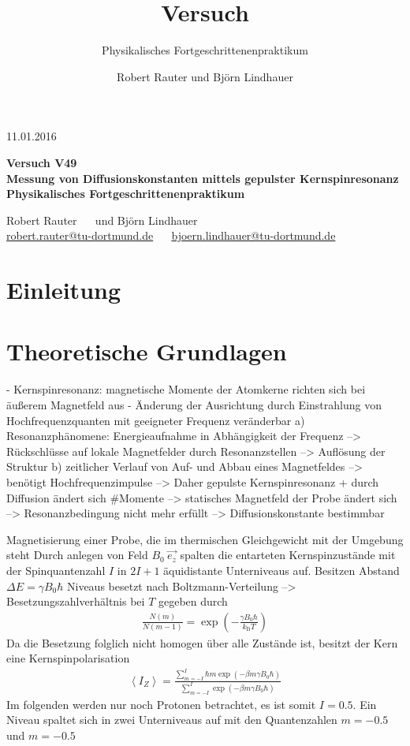 \documentclass[]{scrartcl}
\title{Versuch \versuchnummer\\ \versuchname}
\subtitle{Physikalisches Fortgeschrittenenpraktikum}
\author{Robert Rauter und Björn Lindhauer}
\date{\versuchdatum}
\newcommand{\versuchnummer}{V49}
\newcommand{\versuchname}{Messung von Diffusionskonstanten mittels gepulster Kernspinresonanz}
\newcommand{\versuchdatum}{11.01.2016}
\begin{document}
\begin{titlepage}
{\large \versuchdatum}
\vspace{7cm}
\begin{center}
\textbf{\huge Versuch \versuchnummer}\\
\vspace{0.5cm}
\textbf{\huge \versuchname}\\
\vspace{0.2cm}
\textbf{ Physikalisches Fortgeschrittenenpraktikum}\\
\vspace{9cm}

{\Large Robert Rauter \ \ \hspace{1.5cm} und \hspace{1.5cm} Björn Lindhauer}\\
{ \url{robert.rauter@tu-dortmund.de} \ \ \hspace{2cm} \url{bjoern.lindhauer@tu-dortmund.de}}
\end{center}
\end{titlepage}
\section{Einleitung}

\section{Theoretische Grundlagen}
- Kernspinresonanz: magnetische Momente der Atomkerne richten sich bei äußerem Magnetfeld aus
- Änderung der Ausrichtung durch Einstrahlung von Hochfrequenzquanten mit geeigneter Frequenz veränderbar
a) Resonanzphänomene: Energieaufnahme in Abhängigkeit der Frequenz --> Rückschlüsse auf lokale Magnetfelder durch Resonanzstellen --> Auflösung der Struktur
b) zeitlicher Verlauf von Auf- und Abbau eines Magnetfeldes --> benötigt Hochfrequenzimpulse --> Daher gepulste Kernspinresonanz + durch Diffusion ändert sich \#Momente --> statisches Magnetfeld der Probe ändert sich --> Resonanzbedingung nicht mehr erfüllt  --> Diffusionskonstante bestimmbar


Magnetisierung einer Probe, die im thermischen Gleichgewicht mit der Umgebung steht
Durch anlegen von Feld $B_0\ \vec{e_z}$ spalten die entarteten Kernspinzustände mit der Spinquantenzahl $I$ in $2I+1$ äquidistante Unterniveaus auf.
Besitzen Abstand $\Delta E = \gamma B_0 \hbar$
Niveaus besetzt nach Boltzmann-Verteilung --> Besetzungszahlverhältnis bei $T$ gegeben durch
\begin{align*}
\frac{N\left(m\right)}{N\left(m-1\right)}=\exp \left(-\frac{\gamma B_0\hbar}{k_\text{B}T}\right)
\end{align*}
Da die Besetzung folglich nicht homogen über alle Zustände ist, besitzt der Kern eine Kernspinpolarisation
\begin{align}
\left\langle I_Z \right\rangle = \frac{\sum\limits_{m=-I}^{I} \hbar m \exp\left(-\beta m\gamma B_0 \hbar \right)}{\sum\limits_{m=-I}^{I} \exp\left(-\beta m\gamma B_0 \hbar \right)}
\end{align}
Im folgenden werden nur noch Protonen betrachtet, es ist somit $I=0.5$. Ein Niveau spaltet sich in zwei Unterniveaus auf mit den Quantenzahlen $m=-0.5$ und $m=-0.5$
\end{document}
